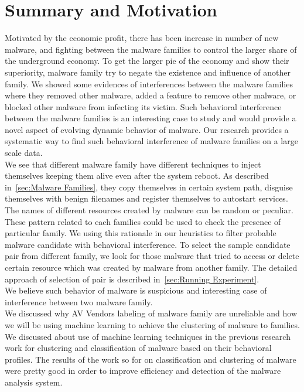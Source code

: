 \section{Summary and Motivation}
\label{sec:Motivation}
Motivated by the economic profit, there has been increase in number of new malware, and fighting between the malware families to control the larger share of the underground economy.
To get the larger pie of the economy and show their superiority, malware family try to negate the existence and influence of another family.
We showed some evidences of interferences between the malware families where they removed other malware, added a feature to remove other malware, or blocked other malware from infecting its victim.
Such behavioral interference between the malware families is an interesting case to study and would provide a novel aspect of evolving dynamic behavior of malware.
Our research provides a systematic way to find such behavioral interference of malware families on a large scale data.
\\
We see that different malware family have different techniques to inject themselves keeping them alive even after the system reboot.
As described in~\autoref{sec:Malware Families}, they copy themselves in certain system path, disguise themselves with benign filenames and register themselves to autostart services.
The names of different resources created by malware can be random or peculiar.
These pattern related to each families could be used to check the presence of particular family.
We using this rationale in our heuristics to filter probable malware candidate with behavioral interference.
To select the sample candidate pair from different family, we look for those malware that tried to access or delete certain resource which was created by malware from another family.
The detailed approach of selection of pair is described in~\autoref{sec:Running Experiment}.\\
We believe such behavior of malware is suspicious and interesting case of interference between two malware family.\\
We discussed why AV Vendors labeling of malware family are unreliable and how we will be using machine learning to achieve the clustering of malware to families.
We discussed about use of machine learning techniques in the previous research work for clustering and classification of malware based on their behavioral profiles.
The results of the work so for on classification and clustering of malware were pretty good in order to improve efficiency and detection of the malware analysis system.

